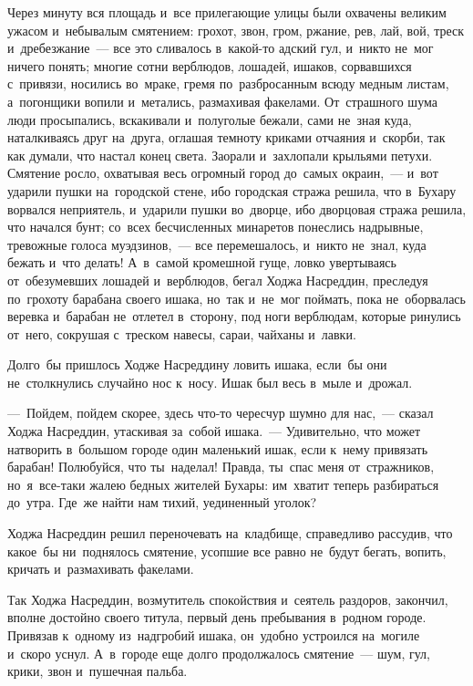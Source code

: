 \documentclass[12pt,a4paper]{book}
\begin{document}
Через минуту вся площадь и~все прилегающие улицы были охвачены великим ужасом и~небывалым смятением: грохот, звон, гром, ржание, рев, лай, вой, треск и~дребезжание~— все это сливалось в~какой-то адский гул, и~никто не~мог ничего понять; многие сотни верблюдов, лошадей, ишаков, сорвавшихся с~привязи, носились во~мраке, гремя по~разбросанным всюду медным листам, а~погонщики вопили и~метались, размахивая факелами. От~страшного шума люди просыпались, вскакивали и~полуголые бежали, сами не~зная куда, наталкиваясь друг на~друга, оглашая темноту криками отчаяния и~скорби, так как думали, что настал конец света. Заорали и~захлопали крыльями петухи. Смятение росло, охватывая весь огромный город до~самых окраин,~— и~вот ударили пушки на~городской стене, ибо городская стража решила, что в~Бухару ворвался неприятель, и~ударили пушки во~дворце, ибо дворцовая стража решила, что начался бунт; со~всех бесчисленных минаретов понеслись надрывные, тревожные голоса муэдзинов,~— все перемешалось, и~никто не~знал, куда бежать и~что делать! А~в~самой кромешной гуще, ловко увертываясь от~обезумевших лошадей и~верблюдов, бегал Ходжа Насреддин, преследуя по~грохоту барабана своего ишака, но~так и~не~мог поймать, пока не~оборвалась веревка и~барабан не~отлетел в~сторону, под ноги верблюдам, которые ринулись от~него, сокрушая с~треском навесы, сараи, чайханы и~лавки.

Долго~бы пришлось Ходже Насреддину ловить ишака, если~бы они не~столкнулись случайно нос к~носу. Ишак был весь в~мыле и~дрожал.

—~Пойдем, пойдем скорее, здесь что-то чересчур шумно для нас,~— сказал Ходжа Насреддин, утаскивая за~собой ишака.~— Удивительно, что может натворить в~большом городе один маленький ишак, если к~нему привязать барабан! Полюбуйся, что ты~наделал! Правда, ты~спас меня от~стражников, но~я~все-таки жалею бедных жителей Бухары: им~хватит теперь разбираться до~утра. Где~же найти нам тихий, уединенный уголок?

Ходжа Насреддин решил переночевать на~кладбище, справедливо рассудив, что какое~бы ни~поднялось смятение, усопшие все равно не~будут бегать, вопить, кричать и~размахивать факелами.

Так Ходжа Насреддин, возмутитель спокойствия и~сеятель раздоров, закончил, вполне достойно своего титула, первый день пребывания в~родном городе. Привязав к~одному из~надгробий ишака, он~удобно устроился на~могиле и~скоро уснул. А~в~городе еще долго продолжалось смятение~— шум, гул, крики, звон и~пушечная пальба.


\chapter{}
\end{document}
